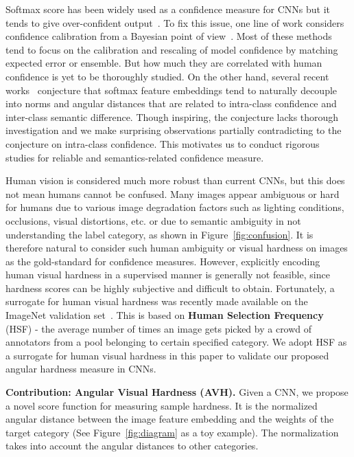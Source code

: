 Softmax score has been widely used as a confidence measure for CNNs but it tends to give over-confident output~\citep{guo2017calibration, li2018reducing}. To fix this issue, one line of work considers confidence calibration from a Bayesian point of view~\cite{NIPS2016_6117,NIPS2017_7219}. Most of these methods tend to focus on the calibration and rescaling of model confidence by matching expected error or ensemble. But how much they are correlated with human confidence is yet to be thoroughly studied. On the other hand, several recent works~\citep{liu2016large,liu2017deep,liu2018decoupled} conjecture that softmax feature embeddings tend to naturally decouple into norms and angular distances that are related to intra-class confidence and inter-class semantic difference. Though inspiring, the conjecture lacks thorough investigation and we make surprising observations partially contradicting to the conjecture on intra-class confidence. This motivates us to conduct rigorous studies for reliable and semantics-related confidence measure.

Human vision is considered much more robust than current CNNs, but this does not mean humans cannot be confused. Many images appear ambiguous or hard for humans due to various image degradation factors such as lighting conditions, occlusions, visual distortions, etc. or due to semantic ambiguity in not understanding the label category, as shown in Figure~\ref{fig:confusion}. It is therefore natural to consider such human ambiguity or visual hardness on images as the gold-standard for confidence measures. However, explicitly encoding human visual hardness in a supervised manner is generally not feasible, since hardness scores can be highly subjective and difficult to obtain. Fortunately, a surrogate for human visual hardness was recently made available on the ImageNet validation set~\citep{recht2019imagenet}. This is based on \textbf{Human Selection Frequency} (HSF) - the average number of times an image gets picked by a crowd of annotators from a pool belonging to certain specified category. We adopt HSF as a surrogate for human visual hardness in this paper to validate our proposed angular hardness measure in CNNs.

\textbf{Contribution: Angular Visual Hardness (AVH).} Given a CNN, we propose a novel score function for measuring sample hardness. It is the normalized angular distance between the image feature embedding and the weights of the target category (See Figure~\ref{fig:diagram} as a toy example). The normalization takes into account the angular distances to other categories. 

